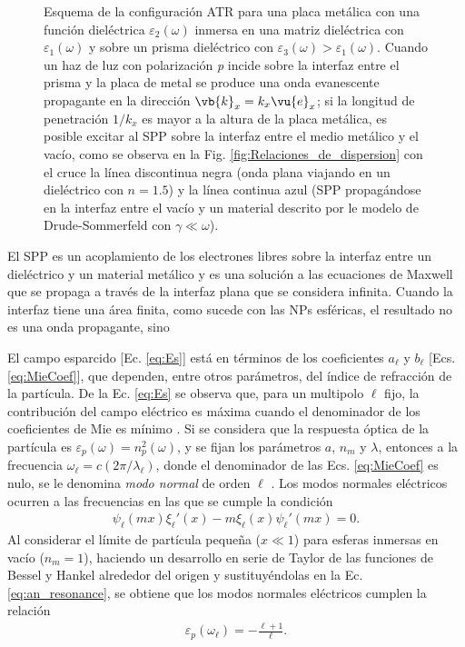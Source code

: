 \begin{figure}[h!]
\begin{tikzpicture}
\end{tikzpicture}	
	\caption{ Esquema de la configuración ATR para una placa metálica con una función dieléctrica $\varepsilon_2(\omega)$ inmersa en una matriz dieléctrica con $\varepsilon_1(\omega)$ y sobre un prisma dieléctrico con $\varepsilon_3(\omega)>\varepsilon_1(\omega)$. Cuando un haz de luz con polarización \emph{p} incide sobre la interfaz entre el prisma y la placa de metal se produce una onda evanescente propagante en la dirección $\vb{k}_x=k_x\vu{e}_x$; si la longitud de penetración $1/k_x$ es mayor a la altura de la placa metálica, es posible excitar al SPP sobre la interfaz entre el medio metálico y el vacío, como se observa en la Fig. \ref{fig:Relaciones_de_dispersion} con el cruce la línea discontinua negra (onda plana viajando en un dieléctrico con $n=1.5$) y la línea continua azul (SPP propagándose en la interfaz entre el vacío y un material descrito por le modelo de Drude-Sommerfeld con $\gamma\ll\omega$).}
	\label{fig:ATR}
	\end{figure}
		
El SPP es un acoplamiento de los electrones libres sobre la interfaz entre un dieléctrico y un material metálico y es una solución a las ecuaciones de Maxwell que se propaga a través de la interfaz plana que se considera infinita. Cuando la interfaz tiene una área finita, como sucede con las NPs esféricas, el resultado no es una onda propagante, sino 


	El campo esparcido [Ec.  \eqref{eq:Es}] está en términos de los coeficientes $a_\ell$ y $b_\ell$ [Ecs.  \eqref{eq:MieCoef}], que dependen, entre otros parámetros, del índice de refracción de la partícula.  De la Ec.  \eqref{eq:Es} se observa que, para un multipolo $\ell$ fijo, la contribución del campo eléctrico es máxima cuando el denominador de los coeficientes de Mie es mínimo \cite{novotny2006principles}.  Si se considera que la respuesta óptica de la partícula es 	$\varepsilon_p (\omega) = n_p^2 (\omega)$, y se fijan los parámetros $a$, $n_m$ y $\lambda$, 	entonces a la frecuencia $\omega_\ell = c (2\pi / \lambda_\ell)$, donde el denominador de las Ecs.  \eqref{eq:MieCoef} es nulo, se le denomina \emph{modo normal} de orden $\ell$ \cite{bohren1998absorption,maciel2017momentum}.  Los modos normales eléctricos ocurren a las frecuencias en las que se cumple la condición 
	\begin{align}
	\psi_\ell(mx)\xi_\ell'(x)-m\xi_\ell(x)\psi_\ell'(mx) = 0. 
	\label{eq:an_resonance}
	\end{align}
Al considerar el límite de partícula pequeña ($x\ll 1$) para esferas inmersas en vacío ($n_m=1$), haciendo un desarrollo en serie de Taylor de las funciones de Bessel y Hankel alrededor del origen y sustituyéndolas en la Ec.  \eqref{eq:an_resonance}, se obtiene que los modos normales eléctricos cumplen la relación \cite{maciel2017momentum}
	\begin{align}
	\varepsilon_p(\omega_\ell) = - \frac{\ell+1}{\ell}.  
	\label{eq:NormalModes}
	\end{align}

